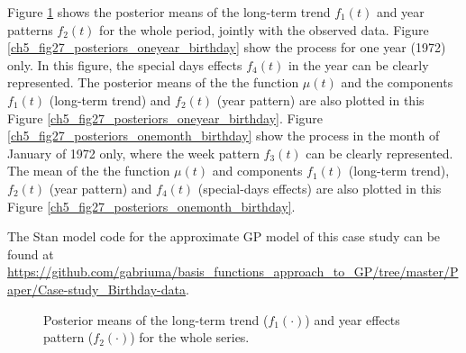 \documentclass[onecolumn,a4paper,11pt]{article}
\begin{document}
Figure \ref{ch5_fig27_posteriors_birthday} shows the posterior means of the long-term trend $f_1(t)$ and year patterns $f_2(t)$ for the whole period, jointly with the observed data. Figure \ref{ch5_fig27_posteriors_oneyear_birthday} show the process for one year (1972) only. In this figure, the special days effects $f_4(t)$ in the year can be clearly represented. The posterior means of the the function $\mu(t)$ and the components $f_1(t)$ (long-term trend) and $f_2(t)$ (year pattern) are also plotted in this Figure \ref{ch5_fig27_posteriors_oneyear_birthday}. Figure \ref{ch5_fig27_posteriors_onemonth_birthday} show the process in the month of January of 1972 only, where the week pattern $f_3(t)$ can be clearly represented. The mean of the the function $\mu(t)$ and components $f_1(t)$ (long-term trend), $f_2(t)$ (year pattern) and $f_4(t)$ (special-days effects) are also plotted in this Figure \ref{ch5_fig27_posteriors_onemonth_birthday}. 

The Stan model code for the approximate GP model of this case study can be found at \small \url{https://github.com/gabriuma/basis_functions_approach_to_GP/tree/master/Paper/Case-study_Birthday-data}.

\begin{figure}
\centering
{}
\caption{Posterior means of the long-term trend ($f_1(\cdot)$) and year effects pattern ($f_2(\cdot)$) for the whole series. }
  \label{ch5_fig27_posteriors_birthday}
\end{figure}
\end{document}
